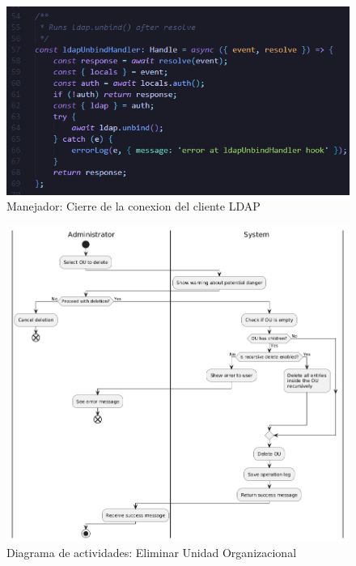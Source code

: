 \begin{figure}[h]
    \centering
    \includegraphics[width=\textwidth]{images/code/ldapUnbindHandler.png}
    \caption{Manejador: Cierre de la conexion del cliente LDAP}
    \label{fig:ldap-unbind-handler}
\end{figure}


\begin{figure}[h]
    \centering
    \includegraphics[width=\linewidth]{images/puml/activity-diagram delete ou/activity-diagram delete ou.png}
    \caption{Diagrama de actividades: Eliminar Unidad Organizacional}
    \label{fig:activity-diagram-delete-ou}
\end{figure}
\restoregeometry

